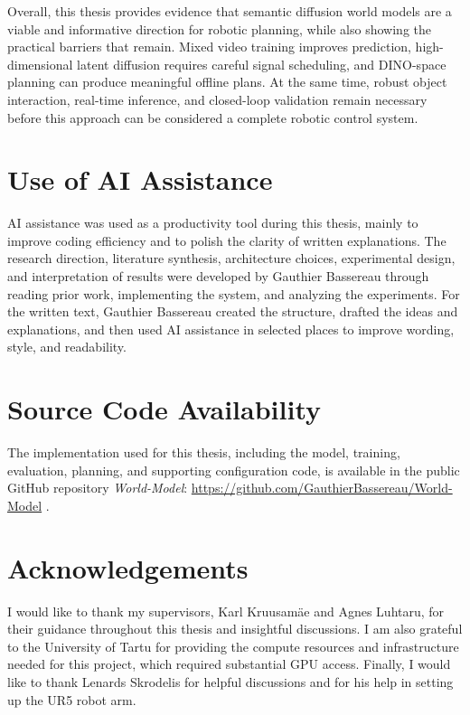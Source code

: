 \documentclass[12pt]{report}
\begin{document}
Overall, this thesis provides evidence that semantic diffusion world models are a viable and informative direction for robotic planning, while also showing the practical barriers that remain. Mixed video training improves prediction, high-dimensional latent diffusion requires careful signal scheduling, and DINO-space planning can produce meaningful offline plans. At the same time, robust object interaction, real-time inference, and closed-loop validation remain necessary before this approach can be considered a complete robotic control system.

\chapter*{Use of AI Assistance}
AI assistance was used as a productivity tool during this thesis, mainly to improve coding efficiency and to polish the clarity of written explanations. The research direction, literature synthesis, architecture choices, experimental design, and interpretation of results were developed by Gauthier Bassereau through reading prior work, implementing the system, and analyzing the experiments. For the written text, Gauthier Bassereau created the structure, drafted the ideas and explanations, and then used AI assistance in selected places to improve wording, style, and readability.

\chapter*{Source Code Availability}
The implementation used for this thesis, including the model, training, evaluation, planning, and supporting configuration code, is available in the public GitHub repository \textit{World-Model}: \url{https://github.com/GauthierBassereau/World-Model} \cite{bassereau2026worldmodelrepo}.

\chapter*{Acknowledgements}
\vspace{5mm}
I would like to thank my supervisors, Karl Kruusamäe and Agnes Luhtaru, for their guidance throughout this thesis and insightful discussions. I am also grateful to the University of Tartu for providing the compute resources and infrastructure needed for this project, which required substantial GPU access. Finally, I would like to thank Lenards Skrodelis for helpful discussions and for his help in setting up the UR5 robot arm.
\end{document}
